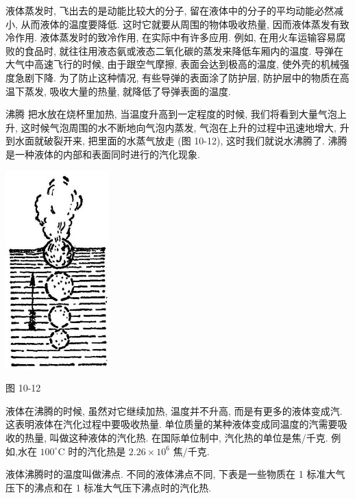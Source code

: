\documentclass[10pt]{article}
\begin{document}
液体蒸发时, 飞出去的是动能比较大的分子, 留在液体中的分子的平均动能必然减小, 从而液体的温度要降低. 这时它就要从周围的物体吸收热量, 因而液体蒸发有致冷作用. 液体蒸发时的致冷作用, 在实际中有许多应用. 例如, 在用火车运输容易腐败的食品时, 就往往用液态氨或液态二氧化碳的蒸发来降低车厢内的温度. 导弹在大气中高速飞行的时候, 由于跟空气摩擦, 表面会达到极高的温度, 使外壳的机械强度急剧下降. 为了防止这种情况, 有些导弹的表面涂了防护层, 防护层中的物质在高温下蒸发, 吸收大量的热量, 就降低了导弹表面的温度.

沸腾 把水放在烧杯里加热, 当温度升高到一定程度的时候, 我们将看到大量气泡上升, 这时候气泡周围的水不断地向气泡内蒸发, 气泡在上升的过程中迅速地增大, 升到水面就破裂开来, 把里面的水蒸气放走 (图 10-12), 这时我们就说水沸腾了. 沸腾是一种液体的内部和表面同时进行的汽化现象.

\begin{center}
\includegraphics[max width=0.3\textwidth]{images/01912d55-147c-70aa-b0e0-1782a122f948_303_644507.jpg}
\end{center}

图 10-12

液体在沸腾的时候, 虽然对它继续加热, 温度并不升高, 而是有更多的液体变成汽. 这表明液体在汽化过程中要吸收热量. 单位质量的某种液体变成同温度的汽需要吸收的热量, 叫做这种液体的汽化热. 在国际单位制中, 汽化热的单位是焦/千克. 例如,水在 \({100}^{ \circ }\mathrm{C}\) 时的汽化热是 \({2.26} \times {10}^{6}\) 焦/千克.

液体沸腾时的温度叫做沸点. 不同的液体沸点不同, 下表是一些物质在 1 标准大气压下的沸点和在 1 标准大气压下沸点时的汽化热.
\end{document}
